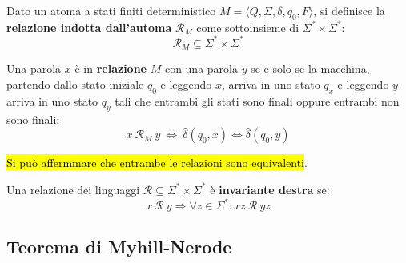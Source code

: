 \documentclass[12pt, a4paper, oneside]{book}
\begin{document}
  Dato un atoma a stati finiti deterministico $M = \langle Q, \Sigma, \delta, q_0, F \rangle$, si definisce la \textcolor{azzurrino}{\textbf{relazione indotta dall'automa}} $\mathcal{R}_M$ come sottoinsieme di $\Sigma^* \times \Sigma^*$:
  \begin{equation*}
    \mathcal{R}_M \subseteq \Sigma^* \times \Sigma^*
  \end{equation*}

  Una parola $x$ è in \textbf{relazione} $M$ con una parola $y$ se e solo se la macchina, partendo dallo stato iniziale $q_0$ e leggendo $x$, arriva in uno stato $q_x$ e leggendo $y$ arriva in uno stato $q_y$ tali che entrambi gli stati sono finali oppure entrambi non sono finali:
  \begin{equation*}
    x \ \mathcal{R}_M \ y \ \Leftrightarrow \ \hat{\delta}(q_0, x) \Leftrightarrow \hat{\delta}(q_0, y)
  \end{equation*}


  \hl{Si può affermmare che entrambe le relazioni sono equivalenti}.

  Una relazione dei linguaggi $\mathcal{R} \subseteq \Sigma^* \times \Sigma^*$ è \textbf{invariante destra} se:
  \begin{equation*}
    x \ \mathcal{R} \ y \Rightarrow \forall z \in \Sigma^*: xz \ \mathcal{R} \ yz
  \end{equation*}



  \subsection{Teorema di Myhill-Nerode}

\end{document}
